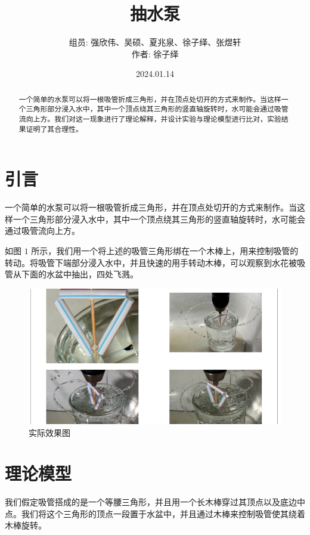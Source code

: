 \documentclass[fontset=windows]{article}
\title{\heiti\zihao{2} 抽水泵}
\author{组员: 强欣伟、吴硕、夏兆泉、徐子绎、张煜轩 \\ 作者: 徐子绎}
\date{2024.01.14}
\begin{document}
	\maketitle

\begin{abstract} 
    一个简单的水泵可以将一根吸管折成三角形，并在顶点处切开的方式来制作。当这样一个三角形部分浸入水中，其中一个顶点绕其三角形的竖直轴旋转时，水可能会通过吸管流向上方。我们对这一现象进行了理论解释，并设计实验与理论模型进行比对，实验结果证明了其合理性。
\end{abstract}

\tableofcontents

\newpage

\section{引言}

一个简单的水泵可以将一根吸管折成三角形，并在顶点处切开的方式来制作。当这样一个三角形部分浸入水中，其中一个顶点绕其三角形的竖直轴旋转时，水可能会通过吸管流向上方。

如图 $1$ 所示，我们用一个将上述的吸管三角形绑在一个木棒上，用来控制吸管的转动。将吸管下端部分浸入水中，并且快速的用手转动木棒，可以观察到水花被吸管从下面的水盆中抽出，四处飞溅。

\begin{figure}[htbp]
    \centering
    \includegraphics[scale=0.5]{7.png}
    \caption{实际效果图}
    \label{1}
\end{figure}


\section{理论模型}

我们假定吸管搭成的是一个等腰三角形，并且用一个长木棒穿过其顶点以及底边中点。我们将这个三角形的顶点一段置于水盆中，并且通过木棒来控制吸管使其绕着木棒旋转。
\end{document}
